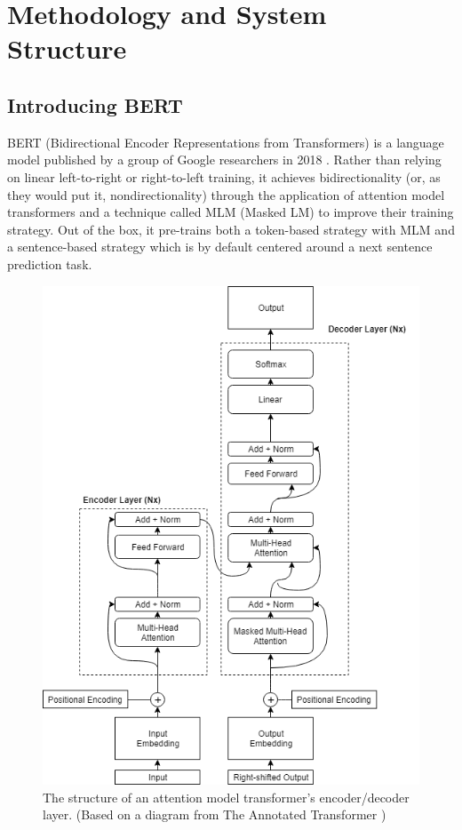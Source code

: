 \documentclass{IEEEtran}
\begin{document}
\section{Methodology and System Structure}
\subsection{Introducing BERT}
	BERT (Bidirectional Encoder Representations from Transformers) is a language model published by a group of Google researchers in 2018 \cite{bert}. Rather than relying on linear left-to-right or right-to-left training, it achieves bidirectionality (or, as they would put it, nondirectionality) through the application of attention model transformers \cite{attention} and a technique called MLM (Masked LM) to improve their training strategy. Out of the box, it pre-trains both a token-based strategy with MLM and a sentence-based strategy which is by default centered around a next sentence prediction task.
	\begin{figure}[h]
		\centering
		\includegraphics[scale=0.4]{transformer.png}
		\caption{The structure of an attention model transformer's encoder/decoder layer. (Based on a diagram from The Annotated Transformer \cite{opennmt})}
		\label{figure:transformer}
	\end{figure}
\end{document}
